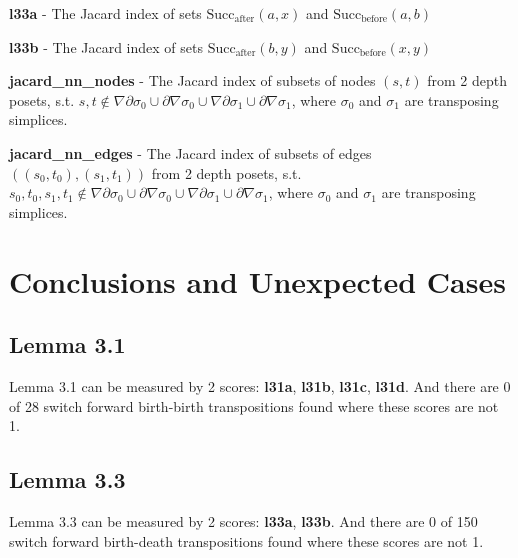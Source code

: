 \documentclass{article}
\begin{document}
\par \textbf{l33a} -
The Jacard index of sets $\text{Succ}_\text{after}(a, x)$ and $\text{Succ}_\text{before}(a, b)$


\par \textbf{l33b} -
The Jacard index of sets $\text{Succ}_\text{after}(b, y)$ and $\text{Succ}_\text{before}(x, y)$


\par \textbf{jacard\_nn\_nodes} -
The Jacard index of subsets of nodes $(s, t)$ from 2 depth posets, s.t.
$s, t \notin \nabla\partial\sigma_0 \cup \partial\nabla\sigma_0 \cup \nabla\partial\sigma_1 \cup \partial\nabla\sigma_1$,
where $\sigma_0$ and $\sigma_1$ are transposing simplices.


\par \textbf{jacard\_nn\_edges} -
The Jacard index of subsets of edges $((s_0, t_0), (s_1, t_1))$ from 2 depth posets, s.t.
$s_0, t_0, s_1, t_1 \notin \nabla\partial\sigma_0 \cup \partial\nabla\sigma_0 \cup \nabla\partial\sigma_1 \cup \partial\nabla\sigma_1$,
where $\sigma_0$ and $\sigma_1$ are transposing simplices.



\section{Conclusions and Unexpected Cases}

\subsection{Lemma 3.1}
\par Lemma 3.1 can be measured by 2 scores: \textbf{l31a}, \textbf{l31b}, \textbf{l31c}, \textbf{l31d}.
And there are 0 of 28 switch forward birth-birth transpositions found where these scores are not 1.

\subsection{Lemma 3.3}
\par Lemma 3.3 can be measured by 2 scores: \textbf{l33a}, \textbf{l33b}.
And there are 0 of 150 switch forward birth-death transpositions found where these scores are not 1.
\end{document}
